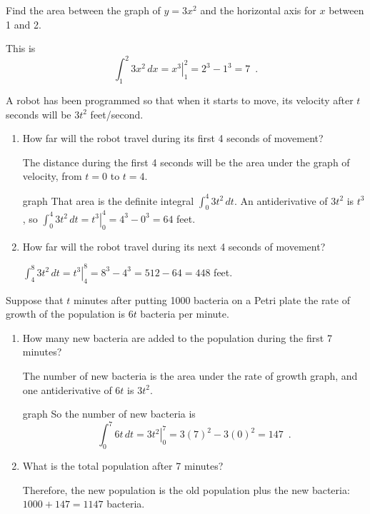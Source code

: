 \begin{example}
Find the area between the graph of $y=3x^2$ and the horizontal axis for $x$ between 1 and 2.

\begin{solution}
  This is
  $$\int_1^2 3x^2\, dx = \left. x^3 \right|_1^2 = 2^3-1^3=7 \enspace .$$
\end{solution}\end{example}

\begin{example}
A robot has been programmed so that when it starts to move, its velocity after $t$ seconds will be $3t^2$ feet/second.
  \begin{enumerate}[label=(\alph*)]
    \item How far will the robot travel during its first 4 seconds of movement?
    \begin{solution}
      The distance during the first 4 seconds will be the area under the graph of velocity, from $t=0$ to $t=4$.

graph
That area is the definite integral $\int_0^4 3t^2\,dt$. An antiderivative of $3t^2$ is $t^3$, so $\int_0^4 3t^2\,dt = \left.t^3\right|_0^4 = 4^3-0^3=64$ feet.
      \end{solution}
    \item How far will the robot travel during its next 4 seconds of movement?
    \begin{solution}
      $\int_4^8 3t^2\, dt = \left.t^3\right|_4^8 = 8^3-4^3=512-64=448$ feet.
      \end{solution}
  \end{enumerate}
\end{example}

\begin{example}
Suppose that $t$ minutes after putting 1000 bacteria on a Petri plate the rate of growth of the population is $6t$ bacteria per minute.
  \begin{enumerate}[label = (\alph*)]
    \item How many new bacteria are added to the population during the first 7 minutes?
    \begin{solution}
      The number of new bacteria is the area under the rate of growth graph, and one antiderivative of $6t$ is $3t^2$.

      graph
      So the number of new bacteria is
      $$\int_0^7 6t\,dt = \left. 3t^2 \right|_0^7 = 3(7)^2-3(0)^2 = 147 \enspace .$$
      \end{solution}
    \item What is the total population after 7 minutes?
    \begin{solution}
      Therefore, the new population is the old population plus the new bacteria: $1000 + 147 = 1147$ bacteria.
      \end{solution}
  \end{enumerate}
\end{example}

